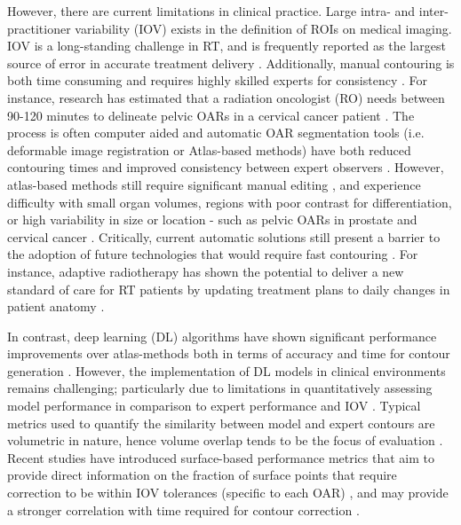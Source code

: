 However, there are current limitations in clinical practice. Large intra- and inter-practitioner variability (IOV) exists in the definition of ROIs on medical imaging. IOV is a long-standing challenge in RT, and is frequently reported as the largest source of error in accurate treatment delivery \cite{Vinod_2016}.
Additionally, manual contouring is both time consuming and requires highly skilled experts for consistency \cite{Nikolov_2018}. For instance, research has estimated that a radiation oncologist (RO) needs between 90-120 minutes to delineate pelvic OARs in a cervical cancer patient \cite{Liu_2020}. The process is often computer aided and automatic OAR segmentation tools (i.e. deformable image registration or Atlas-based methods) have both reduced contouring times and improved consistency between expert observers \cite{Vinod_2016}. However, atlas-based methods still require significant manual editing \cite{Nikolov_2018}, and experience difficulty with small organ volumes, regions with poor contrast for differentiation, or high variability in size or location - such as pelvic OARs in prostate and cervical cancer \cite{Schreier_2020, Liu_2020}. Critically, current automatic solutions still present a barrier to the adoption of future technologies that would require fast contouring \cite{Nikolov_2018}. For instance, adaptive radiotherapy has shown the potential to deliver a new standard of care for RT patients by updating treatment plans to daily changes in patient anatomy \cite{Nikolov_2018}. 

In contrast, deep learning (DL) algorithms have shown significant performance improvements over atlas-methods both in terms of accuracy and time for contour generation \cite{CITATION}. However, the implementation of DL models in clinical environments remains challenging; particularly due to limitations in quantitatively assessing model performance in comparison to expert performance and IOV \cite{Nikolov_2018}. Typical metrics used to quantify the similarity between model and expert contours are volumetric in nature, hence volume overlap tends to be the focus of evaluation \cite{Nikolov_2018}. Recent studies have introduced surface-based performance metrics that aim to provide direct information on the fraction of surface points that require correction to be within IOV tolerances (specific to each OAR) \cite{Nikolov_2018, Vaassen_2020}, and may provide a stronger correlation with time required for contour correction \cite{Vaassen_2020}.

